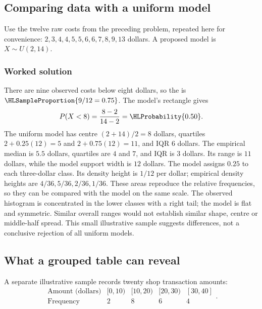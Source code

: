 \subsection{Comparing data with a uniform model}\label{prob:sec:general-worked1}
Use the twelve raw costs from the preceding problem, repeated here for convenience: $2,3,4,4,5,5,6,6,7,8,9,13$ dollars. A proposed model is $X\sim U(2,14)$.
\subsubsection*{Worked solution}\label{sol:sec:general-worked1}
There are nine observed costs below eight dollars, so the  is $\HLSampleProportion{9/12=0.75}$. The model's rectangle gives
\[
P(X<8)=\frac{8-2}{14-2}=\HLProbability{0.50}.
\]
The uniform model has centre $(2+14)/2=8$ dollars, quartiles $2+0.25(12)=5$ and $2+0.75(12)=11$, and IQR $6$ dollars. The empirical median is $5.5$ dollars, quartiles are $4$ and $7$, and IQR is $3$ dollars. Its range is $11$ dollars, while the model support width is $12$ dollars.
The model assigns $0.25$ to each three-dollar class. Its density height is $1/12$ per dollar; empirical density heights are $4/36,5/36,2/36,1/36$. These areas reproduce the relative frequencies, so they can be compared with the model on the same scale. The observed histogram is concentrated in the lower classes with a right tail; the model is flat and symmetric. Similar overall ranges would not establish similar shape, centre or middle-half spread. This small illustrative sample suggests differences, not a conclusive rejection of all uniform models.


\subsection{What a grouped table can reveal}\label{prob:sec:general-worked2}
A separate illustrative sample records twenty shop transaction amounts:
\[
\begin{array}{c|rrrr}
\text{Amount (dollars)} &[0,10)&[10,20)&[20,30)&[30,40]\\ \hline
\text{Frequency}&2&8&6&4
\end{array}.
\]
